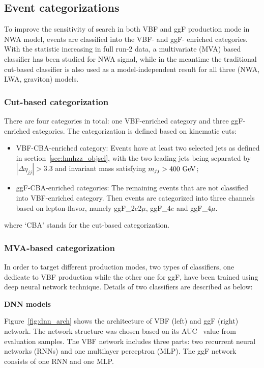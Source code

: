 
\subsection{Event categorizations}
To improve the sensitivity of search in both VBF and ggF production mode in NWA model, events are classified into the VBF- and ggF- enriched categories.
With the statistic increasing in full run-2 data, a multivariate (MVA) based classifier has been studied for NWA signal, 
while in the meantime the traditional cut-based classifier is also used as a model-independent result for all three (NWA, LWA, graviton) models.

\subsubsection{Cut-based categorization}
There are four categories in total: one VBF-enriched category and three ggF-enriched categories.
The categorization is defined based on kinematic cuts:
\begin{itemize}
	\item VBF-CBA-enriched category: Events have at least two selected jets as defined in section~\ref{sec:hmhzz_objsel}, with the two leading jets being separated by $|\Delta \eta_{jj}| > 3.3$ and invariant mass satisfying $m_{jj} > 400~\text{Ge\kern -0.1em V}$;
	\item ggF-CBA-enriched categories: The remaining events that are not classified into VBF-enriched category. Then events are categorized into three channels based on lepton-flavor, namely ggF\_2$e$2$\mu$, ggF\_4$e$ and ggF\_4$\mu$. 
\end{itemize}
where `CBA' stands for the cut-based categorization.

\subsubsection{MVA-based categorization}
In order to target different production modes, two types of classifiers, one dedicate to VBF production while the other one for ggF, have been trained using deep neural network technique.
Details of two classifiers are described as below:

\textbf{DNN models} 

Figure~\ref{fig:dnn_arch} shows the architecture of VBF (left) and ggF (right) network.
The network structure was chosen based on its AUC~\cite{BRADLEY19971145} value from evaluation samples.
The VBF network includes three parts: two recurrent neural networks (RNNs) and one multilayer perceptron (MLP).
The ggF network consists of one RNN and one MLP.

